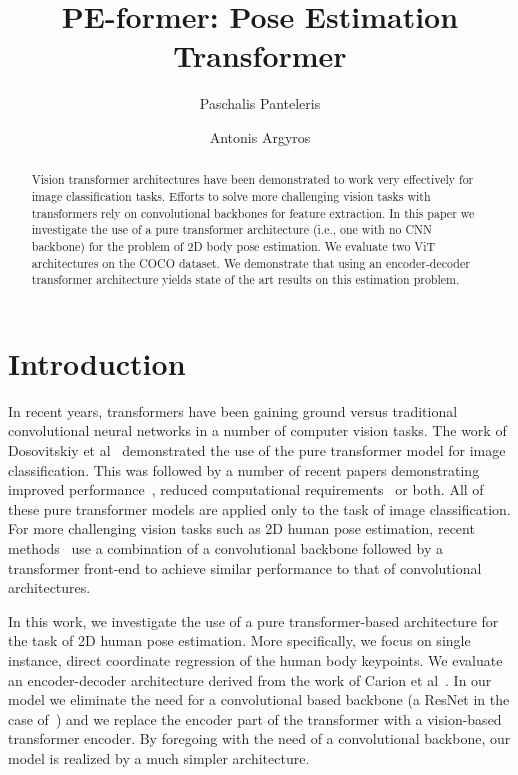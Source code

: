 \documentclass[runningheads]{llncs}
\begin{document}
\title{PE-former: Pose Estimation Transformer}
\author{Paschalis Panteleris \and
Antonis Argyros}
\maketitle  



\begin{abstract}
Vision transformer architectures have been demonstrated to work very effectively for image classification tasks. Efforts to solve more challenging vision tasks with transformers rely on convolutional backbones for feature extraction. In this paper we investigate the use of a pure transformer architecture (i.e., one with no CNN backbone) for the problem of 2D body pose estimation. 
We evaluate two ViT architectures on the COCO dataset. We demonstrate that using an encoder-decoder transformer architecture yields state of the art results on this estimation problem.
\end{abstract}

\section{Introduction}
\label{sec:intro}
In recent years, transformers have been gaining ground versus traditional convolutional neural networks in a number of computer vision tasks. The work of Dosovitskiy et al~\cite{dosovitskiy2020image} demonstrated the use of the pure transformer model for image classification. This was followed by a number of recent papers demonstrating improved performance~\cite{touvron2021training}, 
reduced computational requirements~\cite{xiong2021nystr,wang2020linformer,el2021xcit,yuan2021tokens} 
or both. All of these pure transformer models are applied only to the task of image classification.
For more challenging vision tasks such as 2D human pose estimation, recent methods~\cite{li2021pose,yang2021transpose,mao2021tfpose} use a combination of a convolutional backbone followed by a transformer front-end to achieve similar performance to that of convolutional architectures.

In this work, we investigate the use of a pure transformer-based architecture for the task of 2D human pose estimation. More specifically, we focus on single instance, direct coordinate regression of the human body keypoints. We evaluate an encoder-decoder architecture derived from the work of Carion et al~\cite{carion2020end}. In our model we eliminate the need for a convolutional based backbone 
(a ResNet in the case of~\cite{carion2020end}) and we replace the encoder part of the transformer with a vision-based~\cite{dosovitskiy2020image} transformer encoder.
By foregoing with the need of a convolutional backbone, our model is realized by a much simpler architecture.
\end{document}
